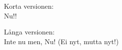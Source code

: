 \vspace{10pt}
Korta versionen:\\
Nu!!\par
\vspace{10pt}
Långa versionen:\\
Inte nu men, Nu! (Ei nyt, mutta nyt!)